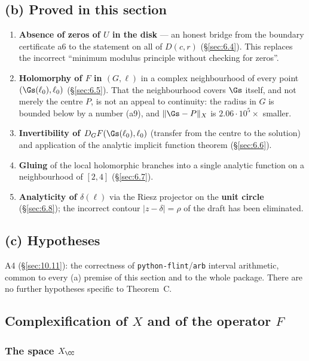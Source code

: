 \subsection*{(b) Proved in this section}
\label{sec:6.2.b}

\begin{enumerate}
\item[1.] \textbf{Absence of zeros of $U$ in the disk} --- an honest bridge from
  the boundary certificate a6 to the statement on all of $D(c,r)$ (\S\ref{sec:6.4}).
  This replaces the incorrect ``minimum modulus principle without checking
  for zeros''.
\item[2.] \textbf{Holomorphy of $F$ in $(G,\ell)$} in a complex neighbourhood of
  every point $(\Gs(\ell_0),\ell_0)$ (\S\ref{sec:6.5}). That the neighbourhood
  covers $\Gs$ itself, and not merely the centre $P$, is not an appeal
  to continuity: the radius in $G$ is bounded below by a number (a9), and
  $\|\Gs-P\|_X$ is $2.06\cdot10^{5}\times$ smaller.
\item[3.] \textbf{Invertibility of $D_GF(\Gs(\ell_0),\ell_0)$} (transfer
  from the centre to the solution) and application of the analytic implicit
  function theorem (\S\ref{sec:6.6}).
\item[4.] \textbf{Gluing} of the local holomorphic branches into a single
  analytic function on a neighbourhood of $[2,4]$ (\S\ref{sec:6.7}).
\item[5.] \textbf{Analyticity of $\delta(\ell)$} via the Riesz projector on the
  \textbf{unit circle} (\S\ref{sec:6.8}); the incorrect contour $|z-\delta|=\rho$ of the
  draft has been eliminated.
\end{enumerate}


\subsection*{(c) Hypotheses}
\label{sec:6.2.c}

A4 (\S\ref{sec:10.11}): the correctness of \texttt{python-flint}/\texttt{arb} interval
arithmetic, common to every (a) premise of this section and to the whole
package. There are no further hypotheses specific to Theorem~C.


\subsection{Complexification of $X$ and of the operator $F$}
\label{sec:6.3}

\subsubsection{The space $X_{\CC}$}
\label{sec:6.3.1}

